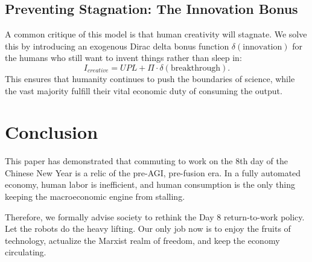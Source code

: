 \documentclass[AER]{AEA}
\DeclareRobustCommand{\AERlink}[1]{}
\begin{document}
\subsection{Preventing Stagnation: The Innovation Bonus}
A common critique of this model is that human creativity will stagnate. We solve this by introducing an exogenous Dirac delta bonus function $\delta(\text{innovation})$ for the humans who still want to invent things rather than sleep in:
\begin{equation}
I_{creative} = UPL + \Pi \cdot \delta(\text{breakthrough}).
\end{equation}
This ensures that humanity continues to push the boundaries of science, while the vast majority fulfill their vital economic duty of consuming the output.

\section{Conclusion}

This paper has demonstrated that commuting to work on the 8th day of the Chinese New Year is a relic of the pre-AGI, pre-fusion era. In a fully automated economy, human labor is inefficient, and human consumption is the only thing keeping the macroeconomic engine from stalling. 

Therefore, we formally advise society to rethink the Day 8 return-to-work policy. Let the robots do the heavy lifting. Our only job now is to enjoy the fruits of technology, actualize the Marxist realm of freedom, and keep the economy circulating.

\FloatBarrier

\DeclareRobustCommand{\AERlink}[1]{\makebox[0pt][r]{\href{#1}{\color{blue}$\blacktriangleright$}\hspace{0.3em}}}

\nocite{*}


\end{document}
